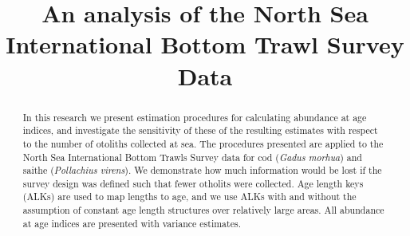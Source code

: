 \documentclass[a4paper 12pt]{article}
\title{\bf 
}
\author{}
\date{}
\numberwithin{equation}{section}
\begin{document}


\title{An analysis of the North Sea International Bottom Trawl Survey Data}

\maketitle


\begin{abstract}

In this research we present estimation procedures for calculating abundance at age indices, and investigate the sensitivity of these of the resulting estimates with respect to the number of otoliths collected at sea. The procedures presented are applied to the North Sea International Bottom Trawls Survey data for cod (\textit{Gadus morhua}) and saithe (\textit{Pollachius virens}). We demonstrate how much information would be lost if the survey design was defined such that fewer otholits were collected. Age length keys (ALKs) are used to map lengths to age, and we use ALKs with and without the assumption of constant age length structures over relatively large areas. All abundance at age indices are presented with variance estimates. \\

\end{abstract}

\end{document}
